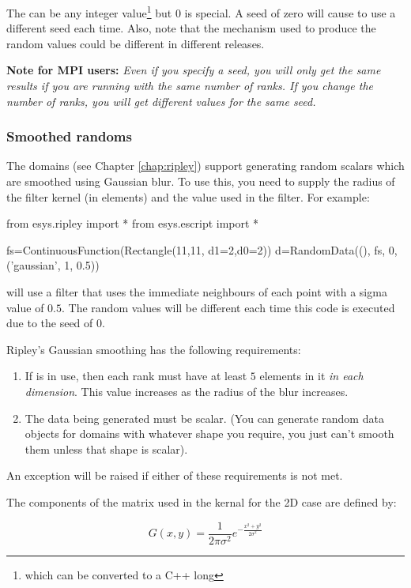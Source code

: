 The  can be any integer value\footnote{which can be converted to a
C++ long} but 0 is special.
A seed of zero will cause \escript to use a different seed each time.
Also, note that the mechanism used to produce the random values could be
different in different releases.

\noindent\textbf{Note for MPI users:}
\textsl{
Even if you specify a seed, you will only get the same results if you are running with the same
number of ranks.
If you change the number of ranks, you will get different values for the same seed.
}

\subsubsection{Smoothed randoms}
The \ripley domains (see Chapter \ref{chap:ripley}) support generating random
scalars which are smoothed using Gaussian blur.
To use this, you need to supply the radius of the filter kernel (in elements)
and the  value used in the filter.
For example:
\begin{python}
from esys.ripley import *
from esys.escript import *

fs=ContinuousFunction(Rectangle(11,11, d1=2,d0=2))
d=RandomData((), fs, 0, ('gaussian', 1, 0.5))
\end{python}
will use a filter that uses the immediate neighbours of each point with a sigma
value of $0.5$.
The random values will be different each time this code is executed due to the
seed of $0$.

Ripley's Gaussian smoothing has the following requirements:
\begin{enumerate}
    \item If \MPI is in use, then each rank must have at least $5$ elements in
          it \emph{in each dimension}. This value increases as the radius of
          the blur increases.
    \item The data being generated must be scalar. (You can generate random
          data objects for \ripley domains with whatever shape you require, you
          just can't smooth them unless that shape is scalar).
\end{enumerate}
An exception will be raised if either of these requirements is not met.

The components of the matrix used in the kernal for the 2D case are
defined\cite{gaussfilter} by:

\[ G(x,y) = \frac{1}{2\pi\sigma^2} e^{-\frac{x^2+y^2}{2\sigma^2}} \]

